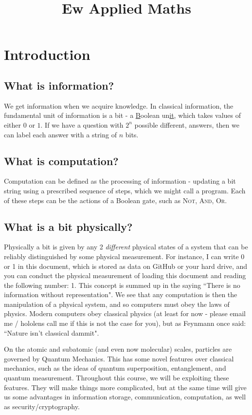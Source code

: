 \documentclass[10pt,a4paper]{article}
\title{Ew Applied Maths}
\begin{document}
\maketitle

\section{Introduction}
\subsection*{What is information?}
We get information when we acquire knowledge. In classical information, the fundamental unit of information is a bit - a \underline{B}oolean un\underline{it}, which takes values of either $0$ or $1$. If we have a question with $2^n$ possible different, answers, then we can label each answer with a string of $n$ bits.

\subsection*{What is computation?}
Computation can be defined as the processing of information - updating a bit string using a prescribed sequence of steps, which we might call a program. Each of these steps can be the actions of a Boolean gate, such as \textsc{Not}, \textsc{And}, \textsc{Or}.

\subsection*{What is a bit physically?}
Physically a bit is given by any 2 \textit{different} physical states of a system that can be reliably distinguished by some physical measurement. For instance, I can write 0 or 1 in this document, which is stored as data on GitHub or your hard drive, and you can conduct the physical measurement of loading this document and reading the following number: 1. This concept is summed up in the saying ``There is no information without representation". We see that any computation is then the manipulation of a physical system, and so computers must obey the laws of physics. Modern computers obey classical physics (at least for now - please email me / hololens call me if this is not the case for you), but as Feynmann once said: ``Nature isn't classical dammit".

On the atomic and subatomic (and even now molecular) scales, particles are governed by Quantum Mechanics. This has some novel features over classical mechanics, such as the ideas of quantum superposition, entanglement, and quantum measurement. Throughout this course, we will be exploiting these features. They will make things more complicated, but at the same time will give us some advantages in information storage, communication, computation, as well as security/cryptography.
\end{document}

